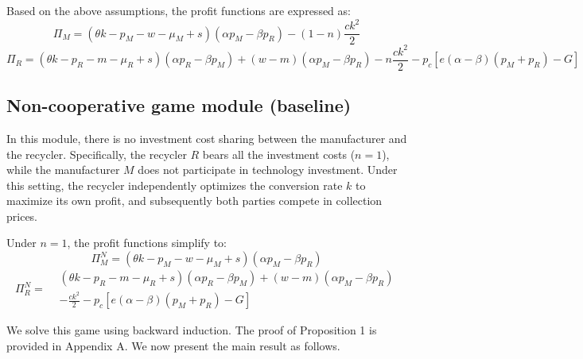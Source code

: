 \documentclass[authoryear,preprint,review,times,10pt]{elsarticle}
\begin{document}
Based on the above assumptions, the profit functions are expressed as:
\begin{equation}
\Pi_M = (\theta k - p_M - w - \mu_M + s)(\alpha p_M - \beta p_R) - (1 - n)\frac{c k^2}{2}
\end{equation}
\begin{equation}
\Pi_R = (\theta k - p_R - m - \mu_R + s)(\alpha p_R - \beta p_M) + (w - m)(\alpha p_M - \beta p_R) - n\frac{c k^2}{2} - p_c\left[ e(\alpha - \beta)(p_M + p_R) - G \right]
\end{equation}

\subsection{Non-cooperative game module (baseline)}
In this module, there is no investment cost sharing between the manufacturer and the recycler. Specifically, the recycler $R$ bears all the investment costs ($n=1$), while the manufacturer $M$ does not participate in technology investment. Under this setting, the recycler independently optimizes the conversion rate $k$ to maximize its own profit, and subsequently both parties compete in collection prices.

Under $n=1$, the profit functions simplify to:
\begin{equation}
\Pi_M^N = (\theta k - p_M - w - \mu_M + s)(\alpha p_M - \beta p_R)
\label{eq:profit_MN}
\end{equation}
\begin{equation}
\Pi_R^N =
\begin{aligned}
& (\theta k - p_R - m - \mu_R + s)(\alpha p_R - \beta p_M) + (w - m)(\alpha p_M - \beta p_R) \\
& - \frac{c k^2}{2} - p_c\left[ e(\alpha - \beta)(p_M + p_R) - G \right]
\end{aligned}
\label{eq:profit_RN}
\end{equation}

We solve this game using backward induction. The proof of Proposition 1 is provided in Appendix A. We now present the main result as follows.
\end{document}

